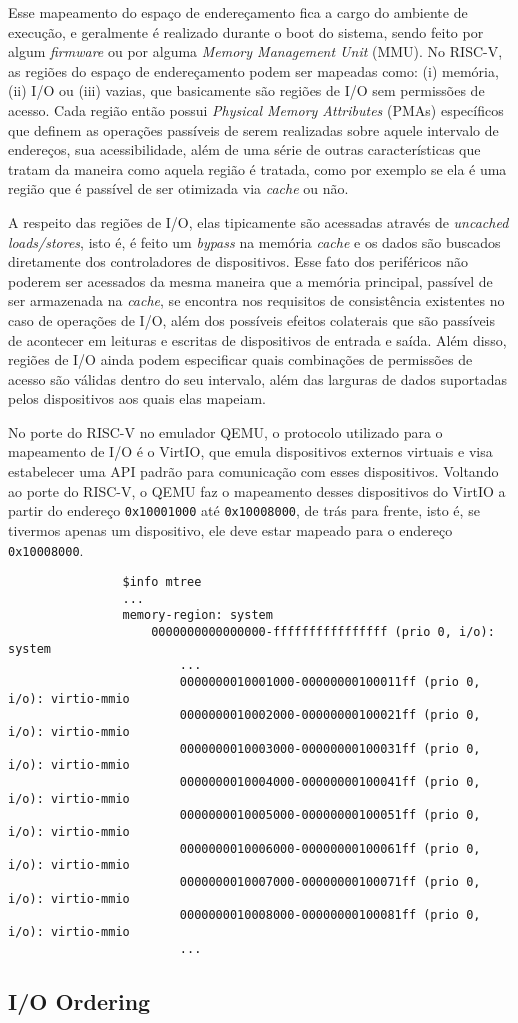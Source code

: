 		Esse mapeamento do espaço de endereçamento fica a cargo do ambiente de execução, e geralmente é
		realizado durante o boot do sistema, sendo feito por algum \textit{firmware} ou por alguma
		\textit{Memory Management Unit} (MMU). No RISC-V, as regiões do espaço de endereçamento podem
		ser mapeadas como: (i) memória, (ii) I/O ou (iii) vazias, que basicamente são regiões de I/O sem
		permissões de acesso. Cada região então possui \textit{Physical Memory Attributes} (PMAs) específicos
		que definem as operações passíveis de serem realizadas sobre aquele intervalo de endereços, sua
		acessibilidade, além de uma série de outras características que tratam da maneira como aquela região
		é tratada, como por exemplo se ela é uma região que é passível de ser otimizada via \textit{cache}
		ou não.

		A respeito das regiões de I/O, elas tipicamente são acessadas através de \textit{uncached loads/stores},
		isto é, é feito um \textit{bypass} na memória \textit{cache} e os dados são buscados diretamente
		dos controladores de dispositivos. Esse fato dos periféricos não poderem ser acessados da mesma
		maneira que a memória principal, passível de ser armazenada na \textit{cache}, se encontra
		nos requisitos de consistência existentes no caso de operações de I/O, além dos possíveis efeitos
		colaterais que são passíveis de acontecer em leituras e escritas de dispositivos de entrada
		e saída. Além disso, regiões de I/O ainda podem especificar quais combinações de permissões de
		acesso são válidas dentro do seu intervalo, além das larguras de dados suportadas pelos dispositivos
		aos quais elas mapeiam.

		No porte do RISC-V no emulador QEMU, o protocolo utilizado para o mapeamento de I/O é o VirtIO, que
		emula dispositivos externos virtuais e visa estabelecer uma API padrão para comunicação com esses
		dispositivos. Voltando ao porte do RISC-V, o QEMU faz o mapeamento desses dispositivos do VirtIO
		a partir do endereço \texttt{0x10001000} até \texttt{0x10008000}, de trás para frente, isto é, se
		tivermos apenas um dispositivo, ele deve estar mapeado para o endereço \texttt{0x10008000}.

		\begin{commandline}
			\begin{verbatim}
				$info mtree
				...
				memory-region: system
				    0000000000000000-ffffffffffffffff (prio 0, i/o): system
				        ...
				        0000000010001000-00000000100011ff (prio 0, i/o): virtio-mmio
				        0000000010002000-00000000100021ff (prio 0, i/o): virtio-mmio
				        0000000010003000-00000000100031ff (prio 0, i/o): virtio-mmio
				        0000000010004000-00000000100041ff (prio 0, i/o): virtio-mmio
				        0000000010005000-00000000100051ff (prio 0, i/o): virtio-mmio
				        0000000010006000-00000000100061ff (prio 0, i/o): virtio-mmio
				        0000000010007000-00000000100071ff (prio 0, i/o): virtio-mmio
				        0000000010008000-00000000100081ff (prio 0, i/o): virtio-mmio
				        ...
			\end{verbatim}
		\end{commandline}


	\subsection*{I/O Ordering}
	

